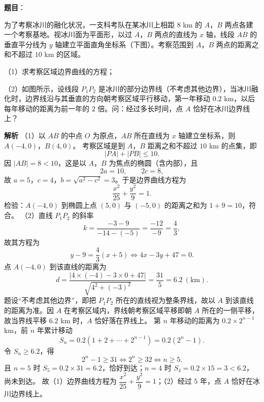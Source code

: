 \begin{answer}

\textbf{题目}：

为了考察冰川的融化状况，一支科考队在某冰川上相距 $8$ km 的 $A$，$B$ 两点各建一个考察基地。视冰川面为平面形，以过 $A$，$B$ 两点的直线为 $x$ 轴，线段 $AB$ 的垂直平分线为 $y$ 轴建立平面直角坐标系（下图）。考察范围到 $A$，$B$ 两点的距离之和不超过 $10$ km 的区域。

（1）求考察区域边界曲线的方程；

（2）如图所示，设线段 $P_1P_2$ 是冰川的部分边界线（不考虑其他边界），当冰川融化时，边界线沿与其垂直的方向朝考察区域平行移动，第一年移动 $0.2$ km，以后每年移动的距离为前一年的 $2$ 倍。问：经过多长时间，点 $A$ 恰好在冰川边界线上？
\nopagebreak[4]
\begin{center}\end{center}
\nopagebreak[4]
\textbf{解析}
（1）以 $AB$ 的中点 $O$ 为原点，$AB$ 所在直线为 $x$ 轴建立坐标系，则 $A(-4,0)$，$B(4,0)$。
考察区域是到 $A$，$B$ 距离之和不超过 $10$ km 的点集，即
\nopagebreak[4]
\[|PA|+|PB|\leqslant10.\]
因 $|AB|=8<10$，这是以 $A$，$B$ 为焦点的椭圆（含内部），且
\nopagebreak[4]
\[2a=10,\qquad 2c=8,\]
故 $a=5$，$c=4$，$b=\sqrt{a^2-c^2}=3$。于是边界曲线方程为
\nopagebreak[4]
\[\frac{x^2}{25}+\frac{y^2}{9}=1.\]
检验：$A(-4,0)$ 到椭圆上点 $(5,0)$ 与 $(-5,0)$ 的距离之和为 $1+9=10$，符合。
（2）直线 $P_1P_2$ 的斜率
\nopagebreak[4]
\[k=\frac{-3-9}{-14-(-5)}=\frac{-12}{-9}=\frac43,\]
故其方程为
\nopagebreak[4]
\[y-9=\frac43(x+5)\iff 4x-3y+47=0.\]
点 $A(-4,0)$ 到该直线的距离为
\nopagebreak[4]
\[d=\frac{|4\times(-4)-3\times0+47|}{\sqrt{4^2+(-3)^2}}=\frac{31}{5}=6.2\ (\text{km}).\]
题设“不考虑其他边界”，即把 $P_1P_2$ 所在的直线视为整条界线，故以 $A$ 到该直线的距离为准。因 $A$ 在考察区域内，界线朝考察区域平移即朝 $A$ 所在的一侧平移，故当界线平移 $6.2$ km 时，$A$ 恰好落在界线上。
第 $n$ 年移动的距离为 $0.2\times2^{n-1}$ km，前 $n$ 年累计移动
\nopagebreak[4]
\[S_n=0.2\left(1+2+\cdots+2^{n-1}\right)=0.2\left(2^n-1\right).\]
令 $S_n\geqslant6.2$，得
\nopagebreak[4]
\[2^n-1\geqslant31\iff2^n\geqslant32\iff n\geqslant5.\]
且 $n=5$ 时 $S_5=0.2\times31=6.2$，恰好到达；$n=4$ 时 $S_4=0.2\times15=3<6.2$，尚未到达。
故（1）边界曲线方程为 $\dfrac{x^2}{25}+\dfrac{y^2}{9}=1$；（2）经过 $5$ 年，点 $A$ 恰好在冰川边界线上。


\end{answer}
